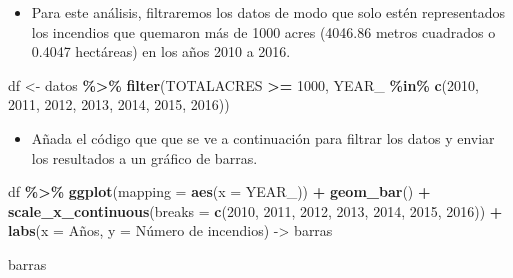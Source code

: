 \documentclass[
]{book}
\newenvironment{Shaded}{\begin{snugshade}}{\end{snugshade}}
\newcommand{\AttributeTok}[1]{\textcolor[rgb]{0.13,0.29,0.53}{#1}}
\newcommand{\DecValTok}[1]{\textcolor[rgb]{0.00,0.00,0.81}{#1}}
\newcommand{\FunctionTok}[1]{\textcolor[rgb]{0.13,0.29,0.53}{\textbf{#1}}}
\newcommand{\NormalTok}[1]{#1}
\newcommand{\OtherTok}[1]{\textcolor[rgb]{0.56,0.35,0.01}{#1}}
\newcommand{\SpecialCharTok}[1]{\textcolor[rgb]{0.81,0.36,0.00}{\textbf{#1}}}
\newcommand{\StringTok}[1]{\textcolor[rgb]{0.31,0.60,0.02}{#1}}
\providecommand{\tightlist}{%
  \setlength{\itemsep}{0pt}\setlength{\parskip}{0pt}}
\begin{document}
\begin{itemize}
\tightlist
\item
  Para este análisis, filtraremos los datos de modo que solo estén representados los incendios que quemaron más de 1000 acres (4046.86 metros cuadrados o 0.4047 hectáreas) en los años 2010 a 2016.
\end{itemize}

\begin{Shaded}
\begin{Highlighting}[]
\NormalTok{df }\OtherTok{\textless{}{-}}\NormalTok{  datos }\SpecialCharTok{\%\textgreater{}\%} 
  \FunctionTok{filter}\NormalTok{(TOTALACRES }\SpecialCharTok{\textgreater{}=} \DecValTok{1000}\NormalTok{,}
\NormalTok{         YEAR\_ }\SpecialCharTok{\%in\%} \FunctionTok{c}\NormalTok{(}\DecValTok{2010}\NormalTok{, }\DecValTok{2011}\NormalTok{, }\DecValTok{2012}\NormalTok{, }\DecValTok{2013}\NormalTok{, }\DecValTok{2014}\NormalTok{, }\DecValTok{2015}\NormalTok{, }\DecValTok{2016}\NormalTok{))}
\end{Highlighting}
\end{Shaded}

\begin{itemize}
\tightlist
\item
  Añada el código que que se ve a continuación para filtrar los datos y enviar los resultados a un gráfico de barras.
\end{itemize}

\begin{Shaded}
\begin{Highlighting}[]
\NormalTok{df }\SpecialCharTok{\%\textgreater{}\%} 
  \FunctionTok{ggplot}\NormalTok{(}\AttributeTok{mapping =} \FunctionTok{aes}\NormalTok{(}\AttributeTok{x =}\NormalTok{ YEAR\_)) }\SpecialCharTok{+} 
  \FunctionTok{geom\_bar}\NormalTok{() }\SpecialCharTok{+}
  \FunctionTok{scale\_x\_continuous}\NormalTok{(}\AttributeTok{breaks =} \FunctionTok{c}\NormalTok{(}\DecValTok{2010}\NormalTok{, }\DecValTok{2011}\NormalTok{, }\DecValTok{2012}\NormalTok{, }\DecValTok{2013}\NormalTok{, }\DecValTok{2014}\NormalTok{, }\DecValTok{2015}\NormalTok{, }\DecValTok{2016}\NormalTok{)) }\SpecialCharTok{+}
  \FunctionTok{labs}\NormalTok{(}\AttributeTok{x =} \StringTok{\textquotesingle{}Años\textquotesingle{}}\NormalTok{,}
       \AttributeTok{y =} \StringTok{\textquotesingle{}Número de incendios\textquotesingle{}}\NormalTok{) }\OtherTok{{-}\textgreater{}}\NormalTok{ barras}

\NormalTok{barras}
\end{Highlighting}
\end{Shaded}
\end{document}
